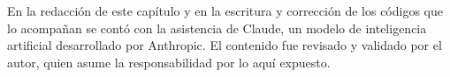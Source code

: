 \respuestaspausas

\begin{parallevar}
En la redacción de este capítulo y en la escritura y corrección de los códigos que lo acompañan se contó con la asistencia de Claude, un modelo de inteligencia artificial desarrollado por Anthropic. El contenido fue revisado y validado por el autor, quien asume la responsabilidad por lo aquí expuesto.
\end{parallevar}
